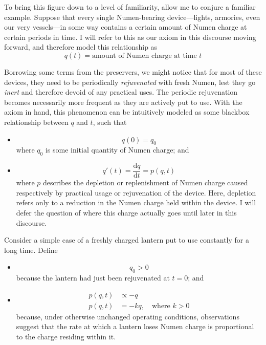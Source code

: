 \documentclass[11pt,a4paper]{article}
\begin{document}
	To bring this figure down to a level of familiarity, allow me to conjure a familiar example. Suppose that every single Numen-bearing device---lights, armories, even our very vessels---in some way contains a certain amount of Numen charge at certain periods in time. I will refer to this as our axiom in this discourse moving forward, and therefore model this relationship as
	\begin{equation}
	q(t) = \text{amount of Numen charge at time } t
	\end{equation}
	
	Borrowing some terms from the preservers, we might notice that for most of these devices, they need to be periodically \emph{rejuvenated} with fresh Numen, lest they go \emph{inert} and therefore devoid of any practical uses. The periodic rejuvenation becomes necessarily more frequent as they are actively put to use. With the axiom in hand, this phenomenon can be intuitively modeled as some blackbox relationship between \(q\) and \(t\), such that
	\begin{itemize}
		\item
		\begin{equation}
		q(0) = q_0
		\end{equation}
		where \(q_0\) is some initial quantity of Numen charge; and
		
		\item
		\begin{equation}
		q'(t) = \frac{\mathrm{d}q}{\mathrm{d}t} = p(q,t)
		\end{equation}
		where \(p\) describes the depletion or replenishment of Numen charge caused respectively by practical usage or rejuvenation of the device. Here, depletion refers only to a reduction in the Numen charge held within the device. I will defer the question of where this charge actually goes until later in this discourse.
	\end{itemize}
	
	Consider a simple case of a freshly charged lantern put to use constantly for a long time. Define
	\begin{itemize}
		\item
		\begin{equation}
		q_0 > 0
		\end{equation}
		because the lantern had just been rejuvenated at \(t = 0\); and
		
		\item
		\begin{equation}
			\begin{aligned}
				p(q,t) &\propto -q \\
				p(q,t) &= -kq, \quad \text{where } k > 0
			\end{aligned}
		\end{equation}
		because, under otherwise unchanged operating conditions, observations suggest that the rate at which a lantern loses Numen charge is proportional to the charge residing within it.
	\end{itemize}
	
\end{document}
